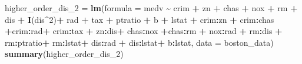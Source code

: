 \documentclass[
]{article}
\newenvironment{Shaded}{\begin{snugshade}}{\end{snugshade}}
\newcommand{\AttributeTok}[1]{\textcolor[rgb]{0.13,0.29,0.53}{#1}}
\newcommand{\DecValTok}[1]{\textcolor[rgb]{0.00,0.00,0.81}{#1}}
\newcommand{\FunctionTok}[1]{\textcolor[rgb]{0.13,0.29,0.53}{\textbf{#1}}}
\newcommand{\NormalTok}[1]{#1}
\newcommand{\OtherTok}[1]{\textcolor[rgb]{0.56,0.35,0.01}{#1}}
\newcommand{\SpecialCharTok}[1]{\textcolor[rgb]{0.81,0.36,0.00}{\textbf{#1}}}
\begin{document}
\begin{Shaded}
\begin{Highlighting}[]
\NormalTok{higher\_order\_dis\_2 }\OtherTok{=} \FunctionTok{lm}\NormalTok{(}\AttributeTok{formula =}\NormalTok{ medv }\SpecialCharTok{\textasciitilde{}}\NormalTok{ crim }\SpecialCharTok{+}\NormalTok{ zn }\SpecialCharTok{+}\NormalTok{ chas }\SpecialCharTok{+}\NormalTok{ nox }\SpecialCharTok{+}\NormalTok{ rm }\SpecialCharTok{+}\NormalTok{ dis }\SpecialCharTok{+} \FunctionTok{I}\NormalTok{(dis}\SpecialCharTok{\^{}}\DecValTok{2}\NormalTok{)}\SpecialCharTok{+}\NormalTok{ rad }\SpecialCharTok{+}\NormalTok{ tax }\SpecialCharTok{+}\NormalTok{ ptratio }\SpecialCharTok{+}\NormalTok{ b }\SpecialCharTok{+}\NormalTok{ lstat }\SpecialCharTok{+}\NormalTok{ crim}\SpecialCharTok{:}\NormalTok{zn }\SpecialCharTok{+}\NormalTok{ crim}\SpecialCharTok{:}\NormalTok{chas  }\SpecialCharTok{+}\NormalTok{crim}\SpecialCharTok{:}\NormalTok{rad}\SpecialCharTok{+}\NormalTok{ crim}\SpecialCharTok{:}\NormalTok{tax }\SpecialCharTok{+}\NormalTok{ zn}\SpecialCharTok{:}\NormalTok{dis}\SpecialCharTok{+}\NormalTok{ chas}\SpecialCharTok{:}\NormalTok{nox }\SpecialCharTok{+}\NormalTok{chas}\SpecialCharTok{:}\NormalTok{rm }\SpecialCharTok{+}\NormalTok{ nox}\SpecialCharTok{:}\NormalTok{rad }\SpecialCharTok{+}\NormalTok{ rm}\SpecialCharTok{:}\NormalTok{dis }\SpecialCharTok{+}\NormalTok{ rm}\SpecialCharTok{:}\NormalTok{ptratio}\SpecialCharTok{+}\NormalTok{ rm}\SpecialCharTok{:}\NormalTok{lstat}\SpecialCharTok{+}\NormalTok{ dis}\SpecialCharTok{:}\NormalTok{rad }\SpecialCharTok{+}\NormalTok{ dis}\SpecialCharTok{:}\NormalTok{lstat}\SpecialCharTok{+}\NormalTok{ b}\SpecialCharTok{:}\NormalTok{lstat, }\AttributeTok{data =}\NormalTok{ boston\_data)}
\FunctionTok{summary}\NormalTok{(higher\_order\_dis\_2)}
\end{Highlighting}
\end{Shaded}
\end{document}
